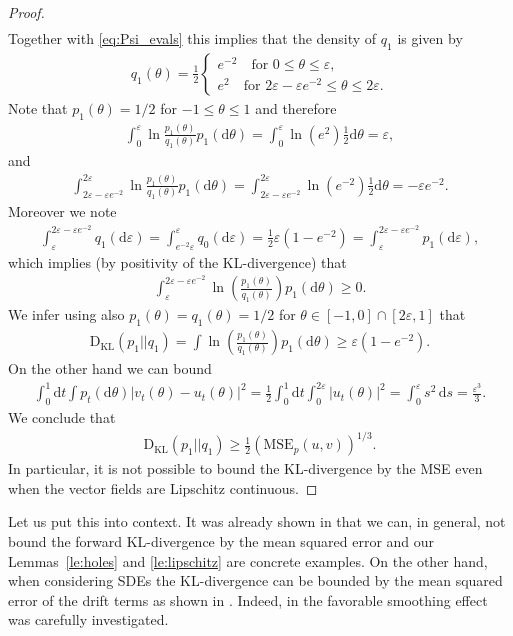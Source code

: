 \documentclass{article}
\theoremstyle{remark}
\newcommand{\eps}{\varepsilon}
\renewcommand{\d}{\mathrm{d}}
\newcommand{\KL}{\mathrm{D_{KL}}}
\begin{document}
\begin{proof}
\begin{align}
\end{align}
Together with \eqref{eq:Psi_evals} this implies that the density of $q_1$ is given by
\begin{align}
    q_1(\theta)
    =\frac12
    \begin{cases}
    e^{-2} \quad \text{for $0\leq \theta \leq \eps$,}
    \\
    e^{2} \quad \text{for $2\eps-\eps e^{-2}\leq \theta \leq 2\eps$.}
    \end{cases}
\end{align}
Note that $p_1(\theta)=1/2$ for $-1\leq \theta\leq 1$ and therefore
\begin{align}
    \int_0^\eps \ln \frac{p_1(\theta)}{q_1(\theta)} p_1(\d \theta)
    = \int_0^\eps \ln(e^2)\frac12 \d \theta
    = \eps,
\end{align}
and
\begin{align}
    \int_{2\eps-\eps e^{-2}}^{2\eps} \ln \frac{p_1(\theta)}{q_1(\theta)} p_1(\d \theta)
    = \int_{2\eps-\eps e^{-2}}^{2\eps} \ln(e^{-2})\frac12 \d \theta
    =- \eps e^{-2} .
\end{align}
Moreover we note 
\begin{align}
    \int_\eps^{2\eps-\eps e^{-2}}
    q_1(\d \eps)
    =
    \int_{e^{-2}\eps}^{\eps}
    q_0(\d\eps)=\frac12 \eps(1-e^{-2})
    =\int_\eps^{2\eps-\eps e^{-2}}
    p_1(\d \eps),
\end{align}
which implies (by positivity of the KL-divergence) that 
\begin{align}
    \int_\eps^{2\eps-\eps e^{-2}} 
    \ln\left(\frac{p_1(\theta)}{q_1(\theta)}\right)
    p_1(\d \theta)\geq 0.
\end{align}
We infer using also 
$p_1(\theta)=q_1(\theta)=1/2$ for $\theta\in [-1, 0]\cap[2\eps,1]$ that
\begin{align}
    \KL (p_1||q_1)
    =\int \ln\left(\frac{p_1(\theta)}{q_1(\theta)}\right)
    p_1(\d \theta)\geq
    \eps (1-e^{-2}).
\end{align}
On the other hand we can bound
\begin{align}
  \int_0^1 \d t  \int p_t(\d\theta) |v_t(\theta)-u_t(\theta)|^2
    = 
 \frac12 \int_0^1 \d t  \int_{0}^{2\eps} |u_t(\theta)|^2
 =\int_0^{\eps} s^2\, \d s =\frac{\eps^3}{3}.
\end{align}
We conclude that 
\begin{align}
    \KL (p_1||q_1)\geq \frac12 \left(\mathrm{MSE}_p(u, v)\right)^{1/3}.
\end{align}
In particular, it is not possible to 
bound the KL-divergence by the MSE even when the vector fields are Lipschitz continuous.
\end{proof}
Let us put this into context. It was already shown in \cite{albergo2023stochastic} that
we can, in general, not bound the forward KL-divergence by the mean squared error and our Lemmas~\ref{le:holes} and \ref{le:lipschitz} are concrete examples. On the other hand,
when considering SDEs the KL-divergence
can be bounded by the mean squared error of the drift terms as shown in \cite{song2021maximum}. Indeed, in \cite{albergo2023stochastic} the favorable smoothing effect was carefully investigated.
\end{document}
